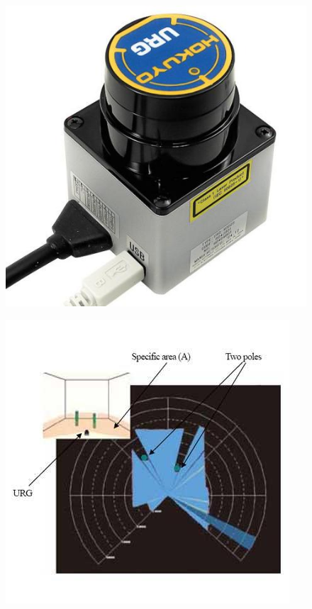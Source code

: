 \begin{enumerate}
\begin{figure}[!ht]
	\begin{minipage}[t]{.49\textwidth}
 		\centering
		\includegraphics[width=0.6\linewidth]{Chapters/Chapter2/Figures/hokuyo.jpg}
		\label{fig:hokuyo}
	\end{minipage}
	\begin{minipage}[t]{.49\textwidth}		
		\centering
 		\centering
		\includegraphics[width=0.75\linewidth]{Chapters/Chapter2/Figures/hokuyo_rays.jpg}
		\label{fig:hokuyo_rays}
	\end{minipage}
\end{figure}

\bigskip


\end{enumerate}
